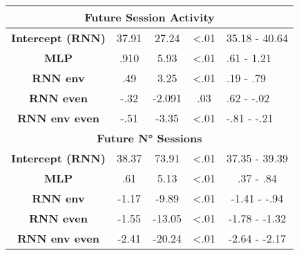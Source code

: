 \begin{table}[h]
\begin{tabular}{ccccc}
\multicolumn{5}{c}{\textbf{Future Session Activity}}                                                                 \\ \hline
\textbf{Intercept (RNN)} & 37.91                & 27.24     & \textless .01  & \multicolumn{1}{l}{35.18 - 40.64} \\
\textbf{MLP}            & .910                & 5.93     & \textless .01  & \multicolumn{1}{l}{.61 - 1.21} \\
\textbf{RNN env}          & .49                & 3.25     & \textless .01  & \multicolumn{1}{l}{.19 - .79} \\
\textbf{RNN even}            & -.32                & -2.091     & .03  & \multicolumn{1}{l}{.62 - -.02} \\
\textbf{RNN env even}             & -.51                & -3.35 & \textless .01  & \multicolumn{1}{l}{-.81 - -.21} \\ \hline

\multicolumn{5}{c}{\textbf{Future N° Sessions}}                                                                      \\ \hline
\textbf{Intercept (RNN)} & 38.37                & 73.91     & \textless .01  & 37.35 - 39.39                     \\
\textbf{MLP}            & .61                & 5.13     & \textless .01  & .37 - .84                     \\
\textbf{RNN env}          &  -1.17              & -9.89     & \textless .01  & -1.41 - -.94                     \\
\textbf{RNN even}            & -1.55                & -13.05     & \textless .01  & -1.78 - -1.32                     \\
\textbf{RNN env even}             & -2.41                & -20.24      & \textless .01  & -2.64 - -2.17                       \\ \hline
\end{tabular}
\end{table}